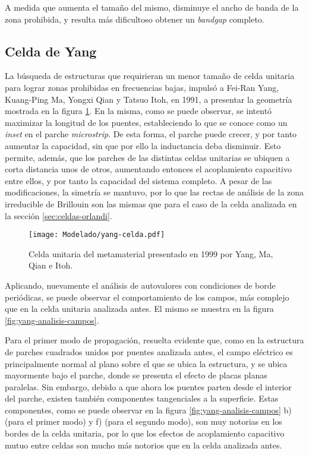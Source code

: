 A medida que aumenta el tamaño del mismo, disminuye el ancho de banda de la zona prohibida, y resulta más dificultoso obtener un \textit{bandgap} completo.

\clearpage

\subsection{Celda de Yang}
\label{sec:celda-yang}

La búsqueda de estructuras que requirieran un menor tamaño de celda unitaria para lograr zonas prohibidas en frecuencias bajas, impulsó a Fei-Ran Yang, Kuang-Ping Ma, Yongxi Qian y Tatsuo Itoh, en 1991, a presentar \cite{Yang:UCPBG} la geometría mostrada en la figura \ref{fig:celda-yang}. En la misma, como se puede observar, se intentó maximizar la longitud de los puentes, estableciendo lo que se conoce como un \textit{inset} en el parche \textit{microstrip}. De esta forma, el parche puede crecer, y por tanto aumentar la capacidad, sin que por ello la inductancia deba disminuir. Esto permite, además, que los parches de las distintas celdas unitarias se ubiquen a corta distancia unos de otros, aumentando entonces el acoplamiento capacitivo entre ellos, y por tanto la capacidad del sistema completo. A pesar de las modificaciones, la simetría se mantuvo, por lo que las rectas de análisis de la zona irreducible de Brillouin son las mismas que para el caso de la celda analizada en la sección \ref{sec:celdas-orlandi}.

\begin{figure}[h]
	\centering
	\texttt{[image: Modelado/yang-celda.pdf]}
	\caption{Celda unitaria del metamaterial presentado en 1999 por Yang, Ma, Qian e Itoh.}
	\label{fig:celda-yang}
\end{figure}

Aplicando, nuevamente el análisis de autovalores con condiciones de borde periódicas, se puede observar el comportamiento de los campos, más complejo que en la celda unitaria analizada antes. El mismo se muestra en la figura \ref{fig:yang-analisis-campos}.

Para el primer modo de propagación, resuelta evidente que, como en la estructura de parches cuadrados unidos por puentes analizada antes, el campo eléctrico es principalmente normal al plano sobre el que se ubica la estructura, y se ubica mayormente bajo el parche, donde se presenta el efecto de placas planas paralelas. Sin embargo, debido  a que ahora los puentes parten desde el interior del parche, existen también componentes tangenciales a la superficie. Estas componentes, como se puede observar en la figura \ref{fig:yang-analisis-campos} b) (para el primer modo) y f) (para el segundo modo), son muy notorias en los bordes de la celda unitaria, por lo que los efectos de acoplamiento capacitivo mutuo entre celdas son mucho más notorios que en la celda analizada antes.


